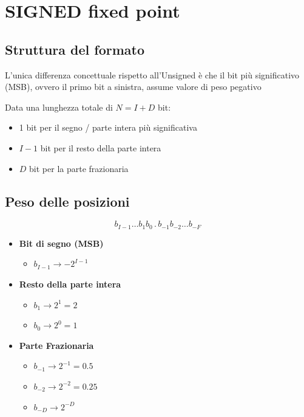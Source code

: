 \newpage
\section{SIGNED fixed point}
\subsection{Struttura del formato}
L'unica differenza concettuale rispetto all'Unsigned è che il bit più significativo (MSB), ovvero il primo bit a sinistra, assume valore di peso pegativo

Data una lunghezza totale di $N = I + D$ bit:
\begin{itemize}
    \item 1 bit per il segno / parte intera più significativa
    \item $I-1$ bit per il resto della parte intera
    \item $D$ bit per la parte frazionaria
\end{itemize}

\subsection{Peso delle posizioni}

{
    \Large
    $$b_{I-1} \dots b_1 b_0 \,.\, b_{-1} b_{-2} \dots b_{-F}$$
}

\begin{itemize}
    \item \textbf{Bit di segno (MSB)}
    \begin{itemize}
        \item $b_{I-1} \to -2^{I-1}$
    \end{itemize}
    \item \textbf{Resto della parte intera}
    \begin{itemize}
        \item $b_1 \to 2^1 = 2$
        \item $b_0 \to 2^0 = 1$
    \end{itemize}
    \item \textbf{Parte Frazionaria}
    \begin{itemize}
        \item $b_{-1} \to 2^{-1} = 0.5$
        \item $b_{-2} \to 2^{-2} = 0.25$
        \item $b_{-D} \to 2^{-D}$
    \end{itemize}
\end{itemize}

